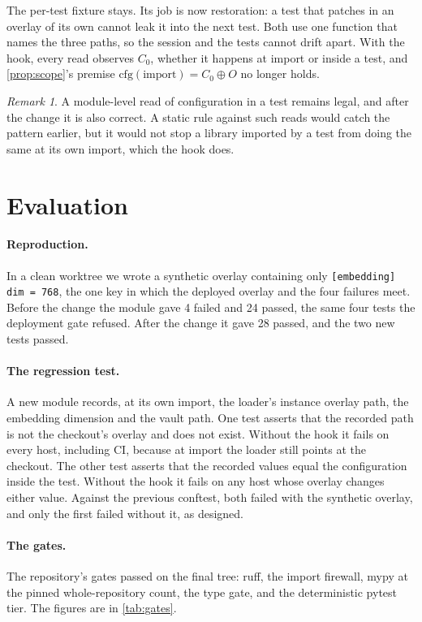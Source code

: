 \documentclass[11pt]{article}
\theoremstyle{plain}
\theoremstyle{definition}
\theoremstyle{remark}
\newtheorem{remark}[theorem]{Remark}
\newcommand{\code}[1]{\texttt{#1}}
\begin{document}
The per-test fixture stays. Its job is now restoration: a test that patches in an overlay of its
own cannot leak it into the next test. Both use one function that names the three paths, so the
session and the tests cannot drift apart. With the hook, every read observes $C_0$, whether it
happens at import or inside a test, and \cref{prop:scope}'s premise $\mathrm{cfg}(\text{import})
= C_0 \oplus O$ no longer holds.

\begin{remark}
A module-level read of configuration in a test remains legal, and after the change it is also
correct. A static rule against such reads would catch the pattern earlier, but it would not stop
a library imported by a test from doing the same at its own import, which the hook does.
\end{remark}

\section{Evaluation}\label{sec:eval}
\paragraph{Reproduction.} In a clean worktree we wrote a synthetic overlay containing only
\code{[embedding] dim = 768}, the one key in which the deployed overlay and the four failures
meet. Before the change the module gave 4 failed and 24 passed, the same four tests the deployment
gate refused. After the change it gave 28 passed, and the two new tests passed.

\paragraph{The regression test.} A new module records, at its own import, the loader's instance
overlay path, the embedding dimension and the vault path. One test asserts that the recorded path
is not the checkout's overlay and does not exist. Without the hook it fails on every host,
including CI, because at import the loader still points at the checkout. The other test asserts
that the recorded values equal the configuration inside the test. Without the hook it fails on any
host whose overlay changes either value. Against the previous conftest, both failed with the
synthetic overlay, and only the first failed without it, as designed.

\paragraph{The gates.} The repository's gates passed on the final tree: ruff, the import
firewall, mypy at the pinned whole-repository count, the type gate, and the deterministic pytest
tier. The figures are in \cref{tab:gates}.
\end{document}
